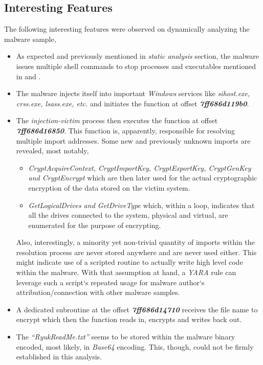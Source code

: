 \documentclass[10pt,a4paper]{article}
\begin{document}
	\subsection{Interesting Features}
	The following interesting features were observed on dynamically analyzing the malware sample,
	\begin{itemize}
	\vspace{-1em}
		\item As expected and previously mentioned in \textit{static analysis} section, the malware issues multiple shell commands to stop processes and executables mentioned in \cite{stoppedProcesses} and \cite{stoppedServices}.
		\item The malware injects itself into important \textit{Windows} services like \textit{sihost.exe, crss.exe, lsass.exe, etc.} and initiates the function at offset \textit{\textbf{7ff686d119b0}}.
		\item The \textit{injection-victim} process then executes the function at offset \textit{\textbf{7ff686d16850}}. This function is, apparently, responsible for resolving multiple import addresses. Some new and previously unknown imports are revealed, most notably,
		\begin{itemize}
	 		\item \textit{CryptAcquireContext, CryptImportKey, CryptExportKey, CryptGenKey and CryptEncrypt} which are then later used for the actual cryptographic encryption of the data stored on the victim system.
			\item \textit{GetLogicalDrives and GetDriveType} which, within a loop, indicates that all the drives connected to the system, physical and virtual, are enumerated for the purpose of encrypting.
		\end{itemize}
		Also, interestingly, a minority yet non-trivial quantity of imports within the resolution process are never stored anywhere and are never used either.
		This might indicate use of a scripted routine to actually write high level code within the malware.
		With that assumption at hand, a \textit{YARA} rule can leverage such a script`s repeated usage for malware author`s attribution/connection with other malware samples.
		\item A dedicated subroutine at the offset \textit{\textbf{7ff686d14710}} receives the file name to encrypt which then the function reads in, encrypts and writes back out.
		\item The \textit{``RyukReadMe.txt''} seems to be stored within the malware binary encoded, most likely, in \textit{Base64} encoding. This, though, could not be firmly established in this analysis.

\end{itemize}
\end{document}
